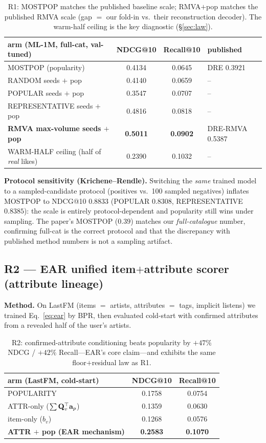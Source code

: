 \begin{table}[h]\centering\small
\begin{tabular}{lccl}
\toprule
arm (ML-1M, full-cat, val-tuned) & NDCG@10 & Recall@10 & published\\
\midrule
MOSTPOP (popularity) & 0.4134 & 0.0645 & DRE 0.3921\\
RANDOM seeds $+$ pop & 0.4140 & 0.0659 & --\\
POPULAR seeds $+$ pop & 0.3547 & 0.0707 & --\\
REPRESENTATIVE seeds $+$ pop & 0.4816 & 0.0818 & --\\
\textbf{RMVA max-volume seeds $+$ pop} & \textbf{0.5011} & \textbf{0.0902} & DRE-RMVA 0.5387\\
\midrule
WARM-HALF ceiling (half of \emph{real} likes) & 0.2390 & 0.1032 & --\\
\bottomrule
\end{tabular}
\caption{R1: MOSTPOP matches the published baseline scale; RMVA$+$pop matches the published RMVA scale (gap $=$
our fold-in vs.\ their reconstruction decoder). The warm-half ceiling is the key diagnostic (\S\ref{sec:law}).}
\label{tab:r1}
\end{table}

\textbf{Protocol sensitivity (Krichene--Rendle).} Switching the \emph{same} trained model to a sampled-candidate
protocol (positives vs.\ 100 sampled negatives) inflates MOSTPOP to NDCG@10 $0.8833$ (POPULAR $0.8308$,
REPRESENTATIVE $0.8385$): the scale is entirely protocol-dependent and popularity still wins under sampling. The
paper's MOSTPOP ($0.39$) matches our \emph{full-catalogue} number, confirming full-cat is the correct protocol and
that the discrepancy with published method numbers is not a sampling artifact.

\subsection{R2 --- EAR unified item$+$attribute scorer (attribute lineage)}
\textbf{Method.} On LastFM (items $=$ artists, attributes $=$ tags, implicit listens) we trained Eq.~\eqref{eq:ear}
by BPR, then evaluated cold-start with confirmed attributes from a revealed half of the user's artists.

\begin{table}[h]\centering\small
\begin{tabular}{lcc}
\toprule
arm (LastFM, cold-start) & NDCG@10 & Recall@10\\
\midrule
POPULARITY & 0.1758 & 0.0754\\
ATTR-only ($\sum \mathbf{Q}_v^\top\mathbf{a}_p$) & 0.1359 & 0.0630\\
item-only ($b_v$) & 0.1268 & 0.0576\\
\textbf{ATTR $+$ pop (EAR mechanism)} & \textbf{0.2583} & \textbf{0.1070}\\
\bottomrule
\end{tabular}
\caption{R2: confirmed-attribute conditioning beats popularity by $+47\%$ NDCG / $+42\%$ Recall---EAR's core
claim---and exhibits the same floor$+$residual law as R1.}
\label{tab:r2}
\end{table}

